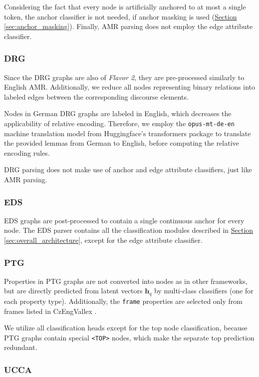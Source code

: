 \documentclass[11pt,a4paper]{article}
\newcommand{\secref}[1]{\hyperref[#1]{Section \ref*{#1}}}
\begin{document}
Considering the fact that every node is artificially anchored to at most a single token, the anchor classifier is not needed, if anchor masking is used (\secref{sec:anchor_masking}). Finally, AMR parsing does not employ the edge attribute classifier.

\subsubsection{DRG}
Since the DRG graphs are also of \emph{Flavor 2}, they are pre-processed similarly to English AMR. Additionally, we reduce all nodes representing binary relations into labeled edges between the corresponding discourse elements.

Nodes in German DRG graphs are labeled in English, which decreases the applicability of relative encoding. Therefore, we employ the \texttt{opus-mt-de-en} \cite{tiedemann2020building} machine translation model from Huggingface's transformers package \cite{wolf2019huggingface} to translate the provided lemmas from German to English, before computing the relative encoding rules.

DRG parsing does not make use of anchor and edge attribute classifiers, just like AMR parsing.


\subsubsection{EDS}
EDS graphs are post-processed to contain a single continuous anchor for every node. The EDS parser contains all the classification modules described in \secref{sec:overall_architecture}, except for the edge attribute classifier.

\subsubsection{PTG}
\label{section:ptg}
Properties in PTG graphs are not converted into nodes as in other frameworks, but are directly predicted from latent vectors $\mathbf{h}_q$ by multi-class classifiers (one for each property type). Additionally, the \texttt{frame} properties are selected only from frames listed in CzEngVallex \cite{uresova2015czengvallex}.

We utilize all classification heads except for the top node classification, because PTG graphs contain special \texttt{<TOP>} nodes, which make the separate top prediction redundant.

\subsubsection{UCCA}
\end{document}
